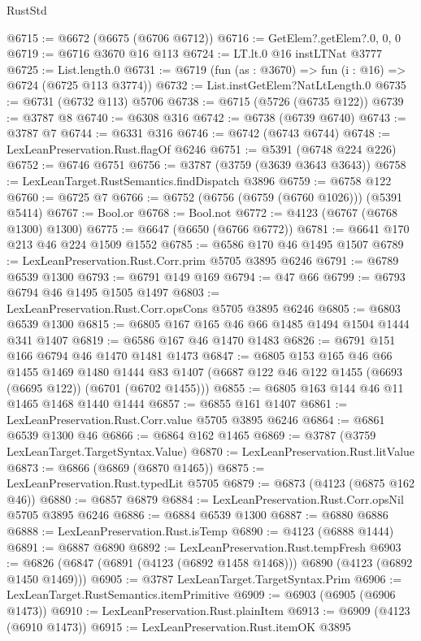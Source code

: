 \begin{lexlean}{RustStd}
\begin{coremodule}
@6715 := @6672 (@6675 (@6706 @6712))
@6716 := GetElem?.getElem?.{0, 0, 0}
@6719 := @6716 @3670 @16 @113
@6724 := LT.lt.{0} @16 instLTNat @3777
@6725 := List.length.{0}
@6731 := @6719 (fun (as : @3670) => fun (i : @16) => @6724 (@6725 @113 @3774))
@6732 := List.instGetElem?NatLtLength.{0}
@6735 := @6731 (@6732 @113) @5706
@6738 := @6715 (@5726 (@6735 @122))
@6739 := @3787 @8
@6740 := @6308 @316
@6742 := @6738 (@6739 @6740)
@6743 := @3787 @7
@6744 := @6331 @316
@6746 := @6742 (@6743 @6744)
@6748 := LexLeanPreservation.Rust.flagOf @6246
@6751 := @5391 (@6748 @224 @226)
@6752 := @6746 @6751
@6756 := @3787 (@3759 (@3639 @3643 @3643))
@6758 := LexLeanTarget.RustSemantics.findDispatch @3896
@6759 := @6758 @122
@6760 := @6725 @7
@6766 := @6752 (@6756 (@6759 (@6760 @1026))) (@5391 @5414)
@6767 := Bool.or
@6768 := Bool.not
@6772 := @4123 (@6767 (@6768 @1300) @1300)
@6775 := @6647 (@6650 (@6766 @6772))
@6781 := @6641 @170 @213 @46 @224 @1509 @1552
@6785 := @6586 @170 @46 @1495 @1507
@6789 := LexLeanPreservation.Rust.Corr.prim @5705 @3895 @6246
@6791 := @6789 @6539 @1300
@6793 := @6791 @149 @169
@6794 := @47 @66
@6799 := @6793 @6794 @46 @1495 @1505 @1497
@6803 := LexLeanPreservation.Rust.Corr.opsCons @5705 @3895 @6246
@6805 := @6803 @6539 @1300
@6815 := @6805 @167 @165 @46 @66 @1485 @1494 @1504 @1444 @341 @1407
@6819 := @6586 @167 @46 @1470 @1483
@6826 := @6791 @151 @166 @6794 @46 @1470 @1481 @1473
@6847 := @6805
    @153
    @165
    @46
    @66
    @1455
    @1469
    @1480
    @1444
    @83
    @1407
    (@6687 @122 @46 @122 @1455 (@6693 (@6695 @122)) (@6701 (@6702 @1455)))
@6855 := @6805 @163 @144 @46 @11 @1465 @1468 @1440 @1444
@6857 := @6855 @161 @1407
@6861 := LexLeanPreservation.Rust.Corr.value @5705 @3895 @6246
@6864 := @6861 @6539 @1300 @46
@6866 := @6864 @162 @1465
@6869 := @3787 (@3759 LexLeanTarget.TargetSyntax.Value)
@6870 := LexLeanPreservation.Rust.litValue
@6873 := @6866 (@6869 (@6870 @1465))
@6875 := LexLeanPreservation.Rust.typedLit @5705
@6879 := @6873 (@4123 (@6875 @162 @46))
@6880 := @6857 @6879
@6884 := LexLeanPreservation.Rust.Corr.opsNil @5705 @3895 @6246
@6886 := @6884 @6539 @1300
@6887 := @6880 @6886
@6888 := LexLeanPreservation.Rust.isTemp
@6890 := @4123 (@6888 @1444)
@6891 := @6887 @6890
@6892 := LexLeanPreservation.Rust.tempFresh
@6903 := @6826 (@6847 (@6891 (@4123 (@6892 @1458 @1468))) @6890 (@4123 (@6892 @1450 @1469)))
@6905 := @3787 LexLeanTarget.TargetSyntax.Prim
@6906 := LexLeanTarget.RustSemantics.itemPrimitive
@6909 := @6903 (@6905 (@6906 @1473))
@6910 := LexLeanPreservation.Rust.plainItem
@6913 := @6909 (@4123 (@6910 @1473))
@6915 := LexLeanPreservation.Rust.itemOK @3895

\end{coremodule}
\end{lexlean}
